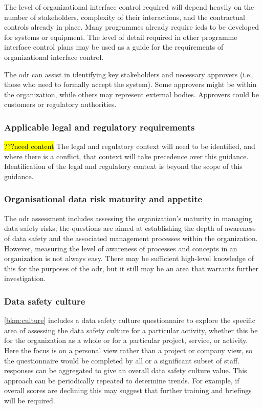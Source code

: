 The level of organizational interface control required will depend heavily on the number of \glspl{stakeholder}, complexity of their interactions, and the contractual controls already in place. Many programmes already require \glspl{icd} to be developed for systems or equipment. The level of detail required in other programme interface control plans may be used as a guide for the requirements of organizational interface control. 

The \gls{odr} can assist in identifying key \glspl{stakeholder} and necessary approvers (i.e., those who need to formally accept the system). Some approvers might be within the organization, while others may represent external bodies. Approvers could be customers or regulatory authorities.

\subsubsection{Applicable legal and regulatory requirements}\hl{???need content}
The legal and regulatory context will need to be identified, and where there is a conflict, that context will take precedence over this guidance. Identification of the legal and regulatory context is beyond the scope of this guidance.
\subsubsection{Organisational data risk maturity and appetite}
The \gls{odr} assessment includes assessing the organization's maturity in managing data safety risks; the questions are aimed at establishing the depth of awareness of data safety and the associated management processes within the organization. However, measuring the level of awareness of processes and concepts in an organization is not always easy. There may be sufficient high-level knowledge of this for the purposes of the \gls{odr}, but it still may be an area that warrants further investigation.

\subsubsection{Data safety culture}
\autoref{bkm:culture} includes a data safety culture questionnaire to explore the specific area of assessing the data safety culture for a particular activity, whether this be for the organization as a whole or for a particular project, service, or activity. Here the focus is on a personal view rather than a project or company view, so the questionnaire would be completed by all or a significant subset of staff. \Glspl{response} can be aggregated to give an overall data safety culture value. This approach can be periodically repeated to determine trends. For example, if overall scores are declining this may suggest that further training and briefings will be required.

